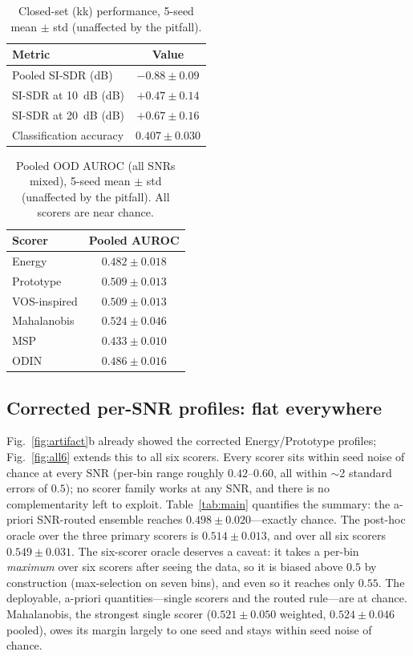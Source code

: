 \documentclass[review,12pt]{elsarticle}
\begin{document}
\begin{table}[H]
\centering
\caption{Closed-set (kk) performance, 5-seed mean $\pm$ std (unaffected
by the pitfall).}
\label{tab:closed}
\begin{tabular}{lc}
\toprule
Metric & Value \\
\midrule
Pooled SI-SDR (dB) & $-0.88 \pm 0.09$ \\
SI-SDR at \SI{10}{dB} (dB) & $+0.47 \pm 0.14$ \\
SI-SDR at \SI{20}{dB} (dB) & $+0.67 \pm 0.16$ \\
Classification accuracy & $0.407 \pm 0.030$ \\
\bottomrule
\end{tabular}
\end{table}

\begin{table}[H]
\centering
\caption{Pooled OOD AUROC (all SNRs mixed), 5-seed mean $\pm$ std
(unaffected by the pitfall). All scorers are near chance.}
\label{tab:pooled}
\begin{tabular}{lc}
\toprule
Scorer & Pooled AUROC \\
\midrule
Energy      & $0.482 \pm 0.018$ \\
Prototype   & $0.509 \pm 0.013$ \\
VOS-inspired & $0.509 \pm 0.013$ \\
Mahalanobis & $0.524 \pm 0.046$ \\
MSP         & $0.433 \pm 0.010$ \\
ODIN        & $0.486 \pm 0.016$ \\
\bottomrule
\end{tabular}
\end{table}

\subsection{Corrected per-SNR profiles: flat everywhere}
\label{sec:flat}

Fig.~\ref{fig:artifact}b already showed the corrected Energy/Prototype
profiles; Fig.~\ref{fig:all6} extends this to all six scorers. Every
scorer sits within seed noise of chance at every SNR (per-bin range
roughly $0.42$--$0.60$, all within $\sim$2 standard errors of $0.5$);
no scorer family works at any SNR, and there is no complementarity
left to exploit. Table~\ref{tab:main} quantifies the summary: the
a-priori SNR-routed ensemble reaches $0.498 \pm 0.020$---exactly
chance. The post-hoc oracle over the three primary scorers is
$0.514 \pm 0.013$, and over all six scorers $0.549 \pm 0.031$. The
six-scorer oracle deserves a caveat: it takes a per-bin \emph{maximum}
over six scorers after seeing the data, so it is biased above $0.5$ by
construction (max-selection on seven bins), and even so it reaches
only $0.55$. The deployable, a-priori quantities---single scorers and
the routed rule---are at chance. Mahalanobis, the strongest single
scorer ($0.521 \pm 0.050$ weighted, $0.524 \pm 0.046$ pooled), owes its
margin largely to one seed and stays within seed noise of chance.
\end{document}
